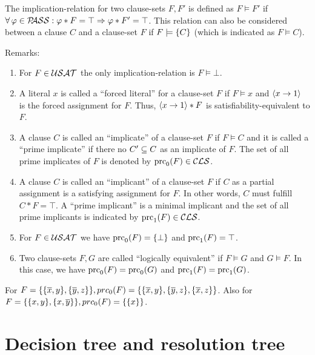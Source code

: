 \documentclass{report}
\begin{document}
\begin{defi}\label{def:imp-rel}
The implication-relation for two clause-sets $F, F'$ is defined as $F \models F'$ if $\forall\, \varphi \in \mathcal{P\hspace{-0.32em}ASS} : \varphi * F = \top \Rightarrow \varphi * F' = \top$. This relation can also be considered between a clause $C$ and a clause-set $F$ if $F \models \{ C \}$ (which is indicated as $F \models C$).
\end{defi}
Remarks:
  \begin{enumerate}
  \item For  $F \in \mathcal{USAT}$ the only implication-relation is $F \models \bot$.
  \item A literal $x$ is called a ``forced literal'' for a clause-set $F$ if $F \models x$ and $\langle x \rightarrow 1 \rangle$ is the forced assignment for $F$. Thus,  $\langle x \rightarrow 1 \rangle * F$ is satisfiability-equivalent to $F$.
  \item A clause $C$ is called an ``implicate'' of a clause-set $F$ if $F \models C$ and it is called a ``prime implicate'' if there no $ C' \subseteq C$ as an implicate of $F$. The set of all prime implicates of $F$ is denoted by $\operatorname{prc}_0(F) \in \mathcal{CLS}$.
  \item A clause $C$ is called an ``implicant'' of a clause-set $F$ if $C$ as a partial assignment is a satisfying assignment for $F$. In other words, $C$ must fulfill $C * F=\top$. A ``prime implicant'' is a minimal implicant and the set of all prime implicants is indicated by $\operatorname{prc}_1(F) \in \mathcal{CLS}$. 
  \item For $F \in \mathcal{USAT}$ we have $\operatorname{prc}_0(F) = \{ \bot \}$ and $\operatorname{prc}_1(F) = \top$.
  \item Two clause-sets $F, G$ are called ``logically equivalent'' if $F \models G$ and $G \models F$. In this case, we have $\operatorname{prc}_0(F) = \operatorname{prc}_0(G)$ and $\operatorname{prc}_1(F) = \operatorname{prc}_1(G)$.
  \end{enumerate}

\begin{examp}\label{exp:bbb}
For $F = \{\{ \overline x, y\} , \{ \overline y, z\}\}, prc_0(F) = \{\{\overline x, y\} , \{\overline y, z\} , \{\overline x, z\}\}$. Also for $F = \{ \{ x, y \} , \{ x,\overline y \} \}, prc_0(F) = \{ \{ x \} \}$.
\end{examp}
\section{Decision tree and resolution tree}
\label{sec:trees}
\end{document}
